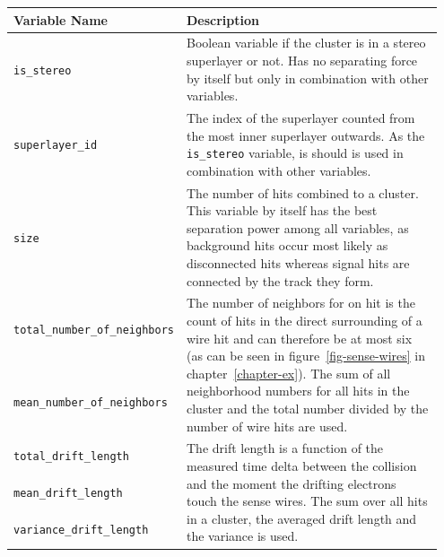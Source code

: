 \begin{table}
  \centering
  \begin{tabular}{p{0.35\linewidth}p{0.60\linewidth}} \toprule
   Variable Name & Description \\ \midrule
   \verb+is_stereo+ & Boolean variable if the cluster is in a stereo superlayer or not. Has no separating force by itself but only in combination with other variables. \\ \midrule 
   \verb+superlayer_id+ & The index of the superlayer counted from the most inner superlayer outwards. As the \verb+is_stereo+ variable, is should is used in combination with other variables.\\ \midrule 
   
   \verb+size+ & The number of hits combined to a cluster. This variable by itself has the best separation power among all variables, as background hits occur most likely as disconnected hits whereas signal hits are connected by the track they form.  \\ \midrule 
   
   \verb+total_number_of_neighbors+ & \multirow{2}{*}[-1.5pt]{\begin{minipage}{\linewidth} The number of neighbors for on hit is the count of hits in the direct surrounding of a wire hit and can therefore be at most six (as can be seen in figure~\ref{fig-sense-wires} in chapter~\ref{chapter-ex}). The sum of all neighborhood numbers for all hits in the cluster and the total number divided by the number of wire hits are used. \end{minipage}} \\[5ex] \cmidrule{1-1}
   \verb+mean_number_of_neighbors+ & \\[5ex] \midrule 
   
   \verb+total_drift_length+ & \multirow{3}{*}[-1.5pt]{\begin{minipage}{\linewidth} The drift length is a function of the measured time delta between the collision and the moment the drifting electrons touch the sense wires. The sum over all hits in a cluster, the averaged drift length and the variance is used. \end{minipage}} \\[1ex] \cmidrule{1-1}
   \verb+mean_drift_length+ & \\[1ex] \cmidrule{1-1}
   \verb+variance_drift_length+ & \\[1ex] \midrule 
   

\end{tabular}
\end{table}
